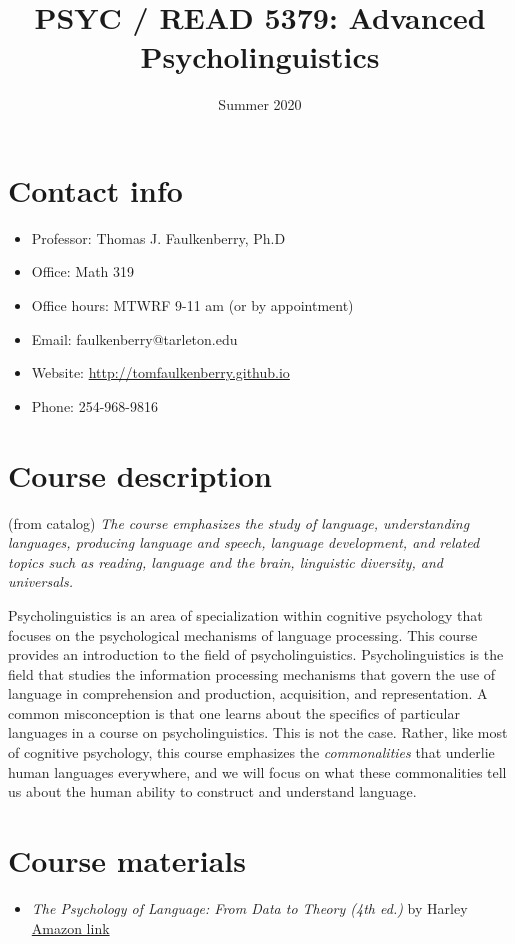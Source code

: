 \documentclass[10pt]{article}
\date{Summer 2020}
\title{PSYC / READ 5379: Advanced Psycholinguistics}
\begin{document}
\maketitle

\section*{Contact info}
\label{sec:orgd497bdb}
\begin{itemize}
\item Professor: Thomas J. Faulkenberry, Ph.D
\item Office: Math 319
\item Office hours: MTWRF 9-11 am (or by appointment)
\item Email: faulkenberry@tarleton.edu
\item Website: \url{http://tomfaulkenberry.github.io}
\item Phone: 254-968-9816
\end{itemize}

\section*{Course description}
\label{sec:org091b702}

(from catalog) \emph{The course emphasizes the study of language, understanding languages, producing language and speech, language development, and related topics such as reading, language and the brain, linguistic diversity, and universals.}

Psycholinguistics is an area of specialization within cognitive psychology that focuses on the psychological mechanisms of language processing.  This course provides an introduction to the field of psycholinguistics. Psycholinguistics is the field that studies the information processing mechanisms that govern the use of language in comprehension and production, acquisition, and representation.  A common misconception is that one learns about the specifics of particular languages in a course on psycholinguistics.  This is not the case.  Rather, like most of cognitive psychology, this course emphasizes the \emph{commonalities} that underlie human languages everywhere, and we will focus on what these commonalities tell us about the human ability to construct and understand language. 

\section*{Course materials}
\label{sec:org9d0e538}
\begin{itemize}
\item \emph{The Psychology of Language: From Data to Theory (4th ed.)} by Harley \href{https://www.amazon.com/Psychology-Language-Data-Theory/dp/1848720890}{Amazon link}
\end{itemize}
\end{document}
